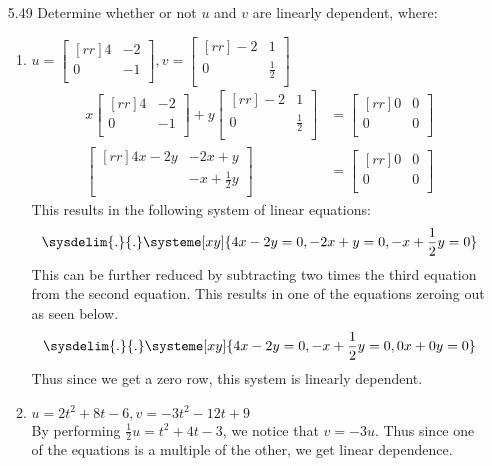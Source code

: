 \documentclass[12pt]{article}
\begin{document}
\begin{enumerate}
\item[5.49] Determine whether or not $u$ and $v$ are linearly dependent, where:
	\begin{enumerate}
	\item $u=\begin{bmatrix}[rr]4&-2\\0&-1\\\end{bmatrix},v=\begin{bmatrix}[rr]-2&1\\0&\frac{1}{2}\\\end{bmatrix}$\\
		\begin{align*}
		x\begin{bmatrix}[rr]4&-2\\0&-1\\\end{bmatrix}+y\begin{bmatrix}[rr]-2&1\\0&\frac{1}{2}\\\end{bmatrix} &= \begin{bmatrix}[rr]0&0\\0&0\\\end{bmatrix}\\
		\begin{bmatrix}[rr]4x-2y&-2x+y\\{}&-x+\frac{1}{2}y\\\end{bmatrix} &= \begin{bmatrix}[rr]0&0\\0&0\\\end{bmatrix}
		\end{align*}		
		This results in the following system of linear equations:
		\[ \sysdelim{.}{.}\systeme[xy]{4x-2y=0,-2x+y=0,-x+\frac{1}{2}y=0} \]
		This can be further reduced by subtracting two times the third equation from the second equation. This results in one of the equations zeroing out as seen below.
		\[ \sysdelim{.}{.}\systeme[xy]{4x-2y=0,-x+\frac{1}{2}y=0,0x+0y=0} \]
		Thus since we get a zero row, this system is linearly dependent.
	\item $u=2t^2+8t-6,v=-3t^2-12t+9$\\
		By performing $\frac{1}{2}u = t^2+4t-3$, we notice that $v=-3u$. Thus since one of the equations is a multiple of the other, we get linear dependence.
	\end{enumerate}
	

\end{enumerate}
\end{document}
